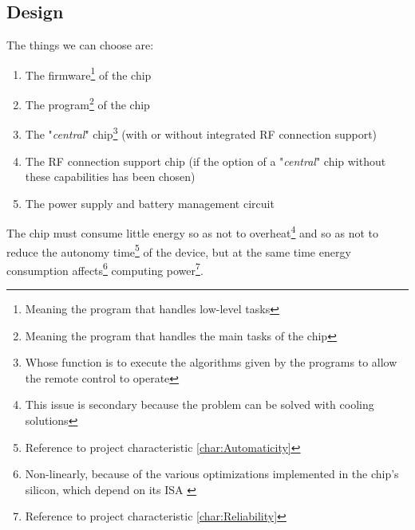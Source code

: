 \documentclass[a4paper, 10pt, final]{article} %
\newcommand{\parenciteit}[2]{\textit{\parencite[#1]{#2}}} %
\begin{document}
    \begin{samepage}
        \subsection{Design}\label{sec:MotherboardDesign}
        \noindent The things we can choose are:
        \begin{enumerate}[label=\emph{(\arabic*)}]
            \item The firmware\footnote{Meaning the program that handles low-level tasks} of the chip
            \item The program\footnote{Meaning the program that handles the main tasks of the chip} of the chip
            \item The "\emph{central}" chip\footnote{Whose function is to execute the algorithms given by the programs to allow the remote control to operate} (with or without integrated RF connection support)
            \item The RF connection support chip (if the option of a "\emph{central}" chip without these capabilities has been chosen)
            \item The power supply and battery management circuit
        \end{enumerate}
    \end{samepage}

    The chip must consume little energy so as not to overheat\footnote{This issue is secondary because the problem can be solved with cooling solutions} and so as not to reduce the autonomy time\footnote{Reference to project characteristic \ref{char:Automaticity}} of the device, but at the same time energy consumption affects\footnote{Non-linearly, because of the various optimizations implemented in the chip's silicon, which depend on its ISA \parenciteit{}{ISA:Wiki}} computing power\footnote{Reference to project characteristic \ref{char:Reliability}}.
\end{document}

